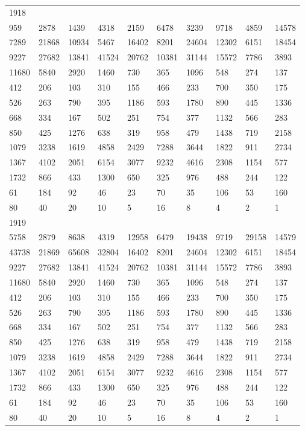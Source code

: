\begin{longtable}{*{10}{l}}
1918&&&&&&&&&\\
959& 2878& 1439& 4318& 2159& 6478& 3239& 9718& 4859& 14578\\
7289& 21868& 10934& 5467& 16402& 8201& 24604& 12302& 6151& 18454\\
9227& 27682& 13841& 41524& 20762& 10381& 31144& 15572& 7786& 3893\\
11680& 5840& 2920& 1460& 730& 365& 1096& 548& 274& 137\\
412& 206& 103& 310& 155& 466& 233& 700& 350& 175\\
526& 263& 790& 395& 1186& 593& 1780& 890& 445& 1336\\
668& 334& 167& 502& 251& 754& 377& 1132& 566& 283\\
850& 425& 1276& 638& 319& 958& 479& 1438& 719& 2158\\
1079& 3238& 1619& 4858& 2429& 7288& 3644& 1822& 911& 2734\\
1367& 4102& 2051& 6154& 3077& 9232& 4616& 2308& 1154& 577\\
1732& 866& 433& 1300& 650& 325& 976& 488& 244& 122\\
61& 184& 92& 46& 23& 70& 35& 106& 53& 160\\
80& 40& 20& 10& 5& 16& 8& 4& 2& 1\\

1919&&&&&&&&&\\
5758& 2879& 8638& 4319& 12958& 6479& 19438& 9719& 29158& 14579\\
43738& 21869& 65608& 32804& 16402& 8201& 24604& 12302& 6151& 18454\\
9227& 27682& 13841& 41524& 20762& 10381& 31144& 15572& 7786& 3893\\
11680& 5840& 2920& 1460& 730& 365& 1096& 548& 274& 137\\
412& 206& 103& 310& 155& 466& 233& 700& 350& 175\\
526& 263& 790& 395& 1186& 593& 1780& 890& 445& 1336\\
668& 334& 167& 502& 251& 754& 377& 1132& 566& 283\\
850& 425& 1276& 638& 319& 958& 479& 1438& 719& 2158\\
1079& 3238& 1619& 4858& 2429& 7288& 3644& 1822& 911& 2734\\
1367& 4102& 2051& 6154& 3077& 9232& 4616& 2308& 1154& 577\\
1732& 866& 433& 1300& 650& 325& 976& 488& 244& 122\\
61& 184& 92& 46& 23& 70& 35& 106& 53& 160\\
80& 40& 20& 10& 5& 16& 8& 4& 2& 1\\


\end{longtable}
